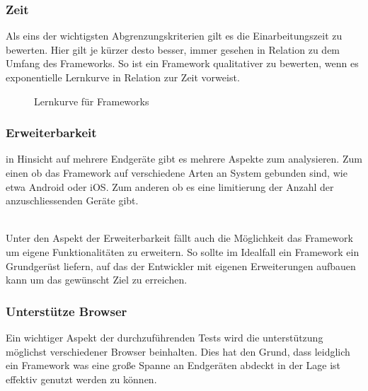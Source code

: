 	\subsubsection{Zeit}
	Als eins der wichtigsten Abgrenzungskriterien gilt es die Einarbeitungszeit zu bewerten. Hier gilt je kürzer desto besser, immer gesehen in Relation 	zu dem Umfang des Frameworks. So ist ein Framework qualitativer zu bewerten, wenn es exponentielle Lernkurve in Relation zur Zeit vorweist.

\begin{figure}[H]
	\centering
	\vspace{-25pt}
	\caption[Darstellung der Lernkurve für Frameworks]{Lernkurve für Frameworks}
\end{figure}
\vspace{-40pt}


	\pagebreak
	 \subsubsection{Erweiterbarkeit}
	 in Hinsicht auf mehrere Endgeräte gibt es mehrere Aspekte zum analysieren. Zum einen ob das Framework auf verschiedene 	Arten an System gebunden sind, wie etwa Android oder iOS. Zum anderen ob es eine limitierung der Anzahl der 				anzuschliessenden Geräte gibt. 

	\\Unter den Aspekt der Erweiterbarkeit fällt auch die Möglichkeit das Framework um eigene Funktionalitäten zu erweitern. So 		sollte im Idealfall ein Framework ein Grundgerüst liefern, auf das der Entwickler mit eigenen Erweiterungen aufbauen kann um 	das gewünscht Ziel zu erreichen.

	\subsubsection{Unterstütze Browser}
	Ein wichtiger Aspekt der durchzuführenden Tests wird die unterstützung möglichst verschiedener Browser beinhalten. Dies hat 	den Grund, dass leidglich ein Framework was eine große Spanne an Endgeräten abdeckt in der Lage ist effektiv genutzt werden 	zu können.

